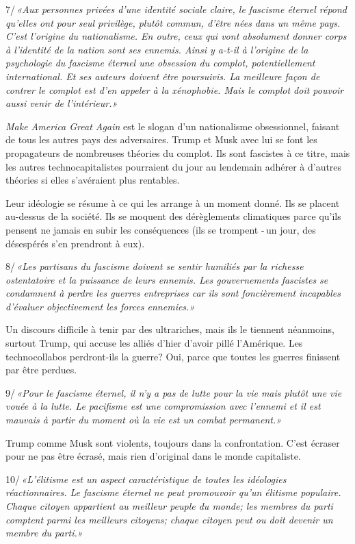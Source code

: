 \documentclass[a5paper, 10pt, twoside]{book}
\begin{document}
7/\,\emph{«Aux personnes privées d’une identité sociale claire, le
fascisme éternel répond qu’elles ont pour seul privilège, plutôt commun,
d’être nées dans un même pays. C’est l’origine du nationalisme. En
outre, ceux qui vont absolument donner corps à l’identité de la nation
sont ses ennemis. Ainsi y a-t-il à l’origine de la psychologie du
fascisme éternel une obsession du complot, potentiellement
international. Et ses auteurs doivent être poursuivis. La meilleure
façon de contrer le complot est d’en appeler à la xénophobie. Mais le
complot doit pouvoir aussi venir de l’intérieur.»}

\emph{Make America Great Again} est le slogan d’un nationalisme
obsessionnel, faisant de tous les autres pays des adversaires. Trump et
Musk avec lui se font les propagateurs de nombreuses théories du
complot. Ils sont fascistes à ce titre, mais les autres
technocapitalistes pourraient du jour au lendemain adhérer à d’autres
théories si elles s’avéraient plus rentables.

Leur idéologie se résume à ce qui les arrange à un moment donné. Ils se
placent au-dessus de la société. Ils se moquent des dérèglements
climatiques parce qu’ils pensent ne jamais en subir les conséquences
(ils se trompent -\,un jour, des désespérés s’en prendront à eux).

8/\,\emph{«Les partisans du fascisme doivent se sentir humiliés par la
richesse ostentatoire et la puissance de leurs ennemis. Les
gouvernements fascistes se condamnent à perdre les guerres entreprises
car ils sont foncièrement incapables d’évaluer objectivement les forces
ennemies.»}

Un discours difficile à tenir par des ultrariches, mais ils le tiennent
néanmoins, surtout Trump, qui accuse les alliés d’hier d’avoir pillé
l’Amérique. Les technocollabos perdront-ils la guerre? Oui, parce que
toutes les guerres finissent par être perdues.

9/\,\emph{«Pour le fascisme éternel, il n’y a pas de lutte pour la vie
mais plutôt une vie vouée à la lutte. Le pacifisme est une compromission
avec l’ennemi et il est mauvais à partir du moment où la vie est un
combat permanent.»}

Trump comme Musk sont violents, toujours dans la confrontation. C’est
écraser pour ne pas être écrasé, mais rien d’original dans le monde
capitaliste.

10/\,\emph{«L’élitisme est un aspect caractéristique de toutes les
idéologies réactionnaires. Le fascisme éternel ne peut promouvoir qu’un
élitisme populaire. Chaque citoyen appartient au meilleur peuple du
monde; les membres du parti comptent parmi les meilleurs citoyens;
chaque citoyen peut ou doit devenir un membre du parti.»}
\end{document}
